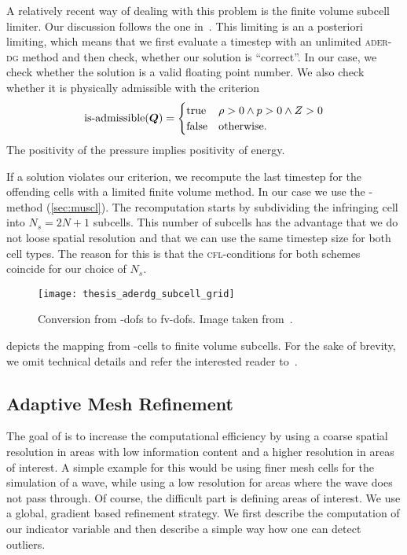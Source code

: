 A relatively recent way of dealing with this problem is the finite volume subcell limiter.
Our discussion follows the one in~\cite{dumbser2016simple}.
This limiting is an a posteriori limiting, which means that we first evaluate a timestep with an unlimited \textsc{ader-dg} method and then check, whether our solution is \enquote{correct}.
In our case, we check whether the solution is a valid floating point number.
We also check whether it is physically admissible with the criterion
\begin{equation}
  \label{eq:limiting-physical}
  \operatorname{is-admissible}(\bm{Q}) =
  \begin{cases}
    \text{true} & \rho > 0 \land p > 0 \land Z > 0 \\
    \text{false} & \text{otherwise}.
  \end{cases}
\end{equation}
The positivity of the pressure implies positivity of energy.

If a solution violates our criterion, we recompute the last timestep for the offending cells with a limited finite volume method.
In our case we use the \muscl{}-method (\cref{sec:muscl}).
The recomputation starts by subdividing the infringing cell into $N_s = 2N + 1$ subcells.
This number of subcells has the advantage that we do not loose spatial resolution and that we can use the same timestep size for both cell types.
The reason for this is that the \textsc{cfl}-conditions for both schemes  coincide for our choice of $N_s$.
\begin{figure}[htb]
  \centering
  \texttt{[image: thesis\_aderdg\_subcell\_grid]}
  \caption{\label{fig:limiting-subcells}Conversion from \dg{}-dofs to fv-dofs. Image taken from~\cite{dumbser2018conformal}. }
\end{figure}

 depicts the mapping from \dg{}-cells to finite volume subcells.
For the sake of brevity, we omit technical details and refer the interested reader to~\cite{dumbser2016simple}.

\subsection{Adaptive Mesh Refinement}\label{sec:amr}
The goal of \amr{} is to increase the computational efficiency by using a coarse spatial resolution in areas with low information content and a higher resolution in areas of interest.
A simple example for this would be using finer mesh cells for the simulation of a wave, while using a low resolution for areas where the wave does not pass through.
Of course, the difficult part is defining areas of interest.
We use a global, gradient based refinement strategy.
We first describe the computation of our indicator variable and then describe a simple way how one can detect outliers.

